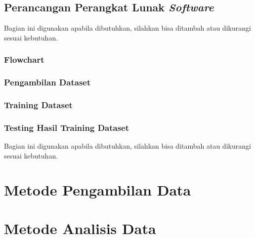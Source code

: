 \subsection{Perancangan Perangkat Lunak \textit{Software}}
Bagian ini digunakan apabila dibutuhkan, silahkan bisa ditambah atau dikurangi sesuai kebutuhan.
\subsubsection{Flowchart}
\subsubsection{Pengambilan Dataset}
\subsubsection{Training Dataset}
\subsubsection{Testing Hasil Training Dataset}
Bagian ini digunakan apabila dibutuhkan, silahkan bisa ditambah atau dikurangi sesuai kebutuhan.
\section{Metode Pengambilan Data}
\section{Metode Analisis Data}
